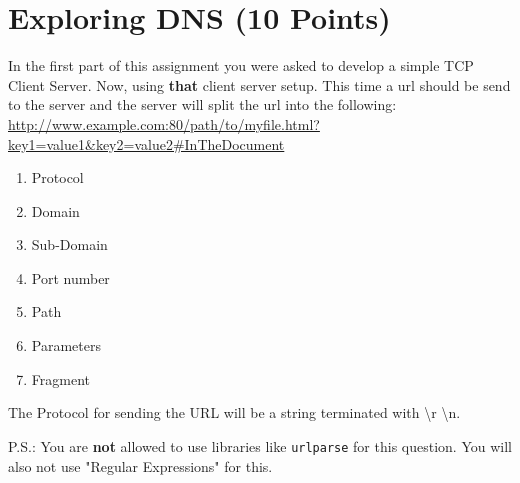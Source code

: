 \documentclass{WeSTassignment}
\begin{document}
\section{Exploring DNS (10 Points)}

In the first part of this assignment you were asked to develop a simple TCP Client Server. Now, using \textbf{that} client server setup.
This time a url should be send to the server and the server will split the url into the following:\\ 

\url{http://www.example.com:80/path/to/myfile.html?key1=value1&key2=value2#InTheDocument}

\begin{enumerate}
\item Protocol
\item Domain
\item Sub-Domain
\item Port number
\item Path
\item Parameters
\item Fragment
\end{enumerate}

The Protocol for sending the URL will be a string terminated with \backslash r \backslash n.

P.S.: You are \textbf{not} allowed to use libraries like \texttt{urlparse} for this question. You will also not use "Regular Expressions" for this. 
\end{document}
